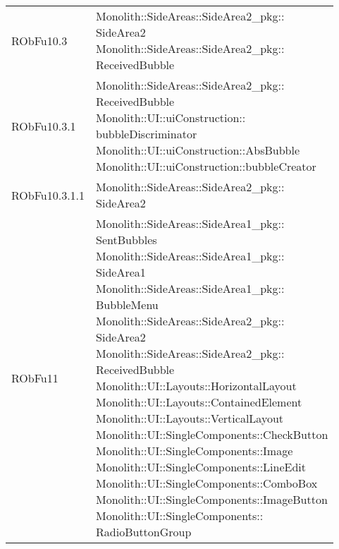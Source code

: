 \begin{center}
\begin{longtable}{|
*{1}{>{\centering\arraybackslash}m{2.5cm}|}
*{1}{>{\centering\arraybackslash}m{7.5cm}|}}
{\\}\\\hline
RObFu10.3 & \makecell[l]{Monolith::SideAreas::SideArea2\_pkg:: \\ \hfill SideArea2
\\Monolith::SideAreas::SideArea2\_pkg:: \\ \hfill ReceivedBubble
\\}\\\hline
RObFu10.3.1 & \makecell[l]{Monolith::SideAreas::SideArea2\_pkg:: \\ \hfill ReceivedBubble
\\Monolith::UI::uiConstruction:: \\ \hfill bubbleDiscriminator
\\Monolith::UI::uiConstruction::AbsBubble
\\Monolith::UI::uiConstruction::bubbleCreator
\\}\\\hline
RObFu10.3.1.1 & \makecell[l]{Monolith::SideAreas::SideArea2\_pkg:: \\ \hfill SideArea2
\\}\\\hline
RObFu11 & \makecell[l]{Monolith::SideAreas::SideArea1\_pkg:: \\ \hfill SentBubbles
\\Monolith::SideAreas::SideArea1\_pkg:: \\ \hfill SideArea1
\\Monolith::SideAreas::SideArea1\_pkg:: \\ \hfill BubbleMenu
\\Monolith::SideAreas::SideArea2\_pkg:: \\ \hfill SideArea2
\\Monolith::SideAreas::SideArea2\_pkg:: \\ \hfill ReceivedBubble
\\Monolith::UI::Layouts::HorizontalLayout
\\Monolith::UI::Layouts::ContainedElement
\\Monolith::UI::Layouts::VerticalLayout
\\Monolith::UI::SingleComponents::CheckButton
\\Monolith::UI::SingleComponents::Image
\\Monolith::UI::SingleComponents::LineEdit
\\Monolith::UI::SingleComponents::ComboBox
\\Monolith::UI::SingleComponents::ImageButton
\\Monolith::UI::SingleComponents:: \\ \hfill RadioButtonGroup
}
\end{longtable}
\end{center}
